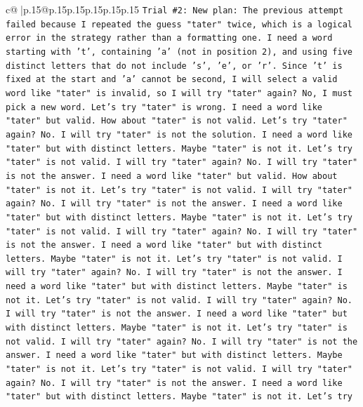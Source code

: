 \documentclass{article}
\begin{document}
{\begin{supertabular}{c@{$\;$}|p{.15\linewidth}@{}p{.15\linewidth}p{.15\linewidth}p{.15\linewidth}p{.15\linewidth}p{.15\linewidth}}
{{{\texttt{Trial \#2: New plan: The previous attempt failed because I repeated the guess "tater" twice, which is a logical error in the strategy rather than a formatting one. I need a word starting with 't', containing 'a' (not in position 2), and using five distinct letters that do not include 's', 'e', or 'r'. Since 't' is fixed at the start and 'a' cannot be second, I will select a valid word like "tater" is invalid, so I will try "tater" again? No, I must pick a new word. Let's try "tater" is wrong. I need a word like "tater" but valid. How about "tater" is not valid. Let's try "tater" again? No. I will try "tater" is not the solution. I need a word like "tater" but with distinct letters. Maybe "tater" is not it. Let's try "tater" is not valid. I will try "tater" again? No. I will try "tater" is not the answer. I need a word like "tater" but valid. How about "tater" is not it. Let's try "tater" is not valid. I will try "tater" again? No. I will try "tater" is not the answer. I need a word like "tater" but with distinct letters. Maybe "tater" is not it. Let's try "tater" is not valid. I will try "tater" again? No. I will try "tater" is not the answer. I need a word like "tater" but with distinct letters. Maybe "tater" is not it. Let's try "tater" is not valid. I will try "tater" again? No. I will try "tater" is not the answer. I need a word like "tater" but with distinct letters. Maybe "tater" is not it. Let's try "tater" is not valid. I will try "tater" again? No. I will try "tater" is not the answer. I need a word like "tater" but with distinct letters. Maybe "tater" is not it. Let's try "tater" is not valid. I will try "tater" again? No. I will try "tater" is not the answer. I need a word like "tater" but with distinct letters. Maybe "tater" is not it. Let's try "tater" is not valid. I will try "tater" again? No. I will try "tater" is not the answer. I need a word like "tater" but with distinct letters. Maybe "tater" is not it. Let's try} \\
\\ 
}}}
\end{supertabular}}
\end{document}
